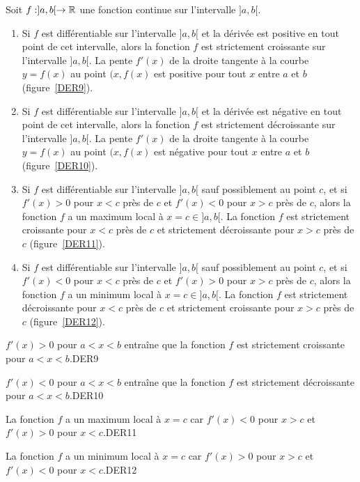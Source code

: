 {\begin{focus}{\prp}\label{CDDth}
Soit $f:]a,b[\rightarrow \mathbb{R}$ une fonction continue sur l'intervalle
$]a,b[$.
\begin{enumerate}
\item Si $f$ est différentiable sur l'intervalle $]a,b[$ et la dérivée
est positive en tout point de cet intervalle, alors la fonction $f$
est strictement croissante sur l'intervalle $]a,b[$.  La
pente $f'(x)$ de la droite tangente à la courbe $y=f(x)$ au point
$(x,f(x)$ est positive pour tout $x$ entre $a$ et $b$
(figure~\ref{DER9}).
\item Si $f$ est différentiable sur l'intervalle $]a,b[$ et la dérivée
est négative en tout point de cet intervalle, alors la fonction $f$
est strictement décroissante sur l'intervalle $]a,b[$.  La pente
$f'(x)$ de la droite tangente à la courbe $y=f(x)$ au point $(x,f(x)$
est négative pour tout $x$ entre $a$ et $b$ (figure~\ref{DER10}).
\item Si $f$ est différentiable sur l'intervalle $]a,b[$ sauf
possiblement au point $c$, et si $f'(x)>0$ pour $x<c$ près de $c$ et
$f'(x)<0$ pour $x>c$ près de $c$, alors la fonction $f$ a un maximum
local à $x = c\in]a,b[$.  La fonction $f$ est strictement croissante
pour $x<c$ près de $c$ et strictement décroissante pour $x>c$ près de
$c$ (figure~\ref{DER11}).
\item Si $f$ est différentiable sur l'intervalle $]a,b[$ sauf
possiblement au point $c$, et si $f'(x)<0$ pour $x<c$ près de $c$ et
$f'(x)>0$ pour $x>c$ près de $c$, alors la fonction $f$ a un minimum
local à $x = c\in]a,b[$.  La fonction $f$ est strictement
décroissante pour $x<c$ près de $c$ et strictement croissante pour
$x>c$ près de $c$ (figure~\ref{DER12}).
\end{enumerate}
\end{focus}

{$f'(x)>0$ pour $a < x < b$ entraîne que la fonction $f$ est
strictement croissante pour $a<x<b$.}{DER9}

{$f'(x)<0$ pour $a < x < b$ entraîne que la fonction $f$ est
strictement décroissante pour $a<x<b$.}{DER10}

{La fonction $f$ a un maximum local à $x=c$ car $f'(x)<0$ pour $x>c$ et
$f'(x)>0$ pour $x<c$.}{DER11}

{La fonction $f$ a un minimum local à $x=c$ car $f'(x)>0$ pour $x>c$ et
$f'(x)<0$ pour $x<c$.}{DER12}

}
